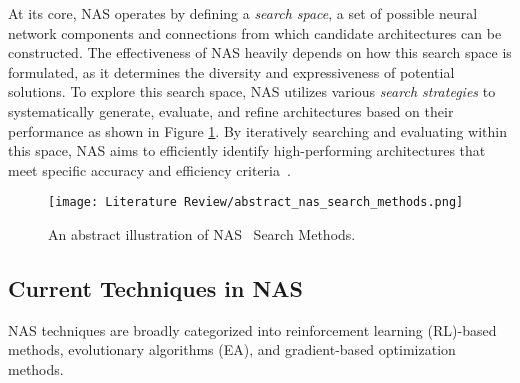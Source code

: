 At its core, NAS operates by defining a \textit{search space}, a set of possible neural network components and connections from which candidate architectures can be constructed. The effectiveness of NAS heavily depends on how this search space is formulated, as it determines the diversity and expressiveness of potential solutions. To explore this search space, NAS utilizes various \textit{search strategies} to systematically generate, evaluate, and refine architectures based on their performance as shown in Figure \ref{fig:abstractNASMethods}. By iteratively searching and evaluating within this space, NAS aims to efficiently identify high-performing architectures that meet specific accuracy and efficiency criteria~\cite{wistuba2019survey,elsken2019neural}.

\begin{figure}[h!]
    \centering
    \texttt{[image: Literature Review/abstract\_nas\_search\_methods.png]}
    \caption{An abstract illustration of NAS~\cite{elsken2019neural} Search Methods.}
    \label{fig:abstractNASMethods}
\end{figure}

\subsection{Current Techniques in NAS}

NAS techniques are broadly categorized into reinforcement learning (RL)-based methods, evolutionary algorithms (EA), and gradient-based optimization methods.


